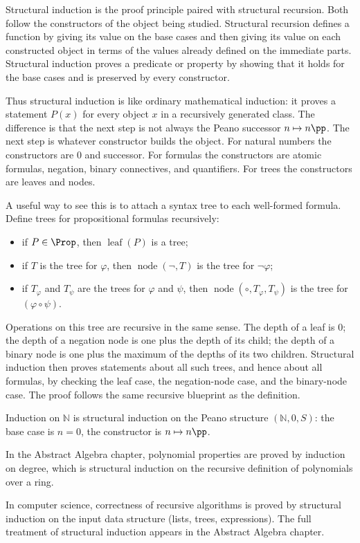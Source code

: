 \begin{remark*}[Exposition]
Structural induction is the proof principle paired with structural recursion.
Both follow the constructors of the object being studied. Structural recursion
defines a function by giving its value on the base cases and then giving its
value on each constructed object in terms of the values already defined on the
immediate parts. Structural induction proves a predicate or property by showing
that it holds for the base cases and is preserved by every constructor.

Thus structural induction is like ordinary mathematical induction: it proves a
statement $P(x)$ for every object $x$ in a recursively generated class. The
difference is that the next step is not always the Peano successor
$n\mapsto n\pp$. The next step is whatever constructor builds the object. For
natural numbers the constructors are $0$ and successor. For formulas the
constructors are atomic formulas, negation, binary connectives, and
quantifiers. For trees the constructors are leaves and nodes.

A useful way to see this is to attach a syntax tree to each well-formed
formula. Define trees for propositional formulas recursively:
\begin{itemize}[itemsep=2pt]
  \item if $P\in\Prop$, then $\operatorname{leaf}(P)$ is a tree;
  \item if $T$ is the tree for $\varphi$, then
    $\operatorname{node}(\neg,T)$ is the tree for $\neg\varphi$;
  \item if $T_\varphi$ and $T_\psi$ are the trees for $\varphi$ and $\psi$,
    then $\operatorname{node}(\circ,T_\varphi,T_\psi)$ is the tree for
    $(\varphi\circ\psi)$.
\end{itemize}
Operations on this tree are recursive in the same sense. The depth of a leaf is
$0$; the depth of a negation node is one plus the depth of its child; the depth
of a binary node is one plus the maximum of the depths of its two children.
Structural induction then proves statements about all such trees, and hence
about all formulas, by checking the leaf case, the negation-node case, and the
binary-node case. The proof follows the same recursive blueprint as the
definition.
\end{remark*}

\begin{remark}
Induction on $\mathbb{N}$ is structural induction on the Peano
structure $(\mathbb{N}, 0, S)$: the base case is $n = 0$, the
constructor is $n \mapsto n\pp$.

In the Abstract Algebra chapter, polynomial properties are proved by
induction on degree, which is structural induction on the recursive
definition of polynomials over a ring.

In computer science, correctness of recursive algorithms is proved by
structural induction on the input data structure (lists, trees,
expressions). The full treatment of structural induction appears in
the Abstract Algebra chapter.
\end{remark}
